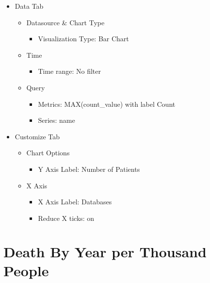 \documentclass[
]{book}
\providecommand{\tightlist}{%
  \setlength{\itemsep}{0pt}\setlength{\parskip}{0pt}}
\begin{document}
\begin{itemize}
\tightlist
\item
  Data Tab

  \begin{itemize}
  \tightlist
  \item
    Datasource \& Chart Type

    \begin{itemize}
    \tightlist
    \item
      Visualization Type: Bar Chart
    \end{itemize}
  \item
    Time

    \begin{itemize}
    \tightlist
    \item
      Time range: No filter
    \end{itemize}
  \item
    Query

    \begin{itemize}
    \tightlist
    \item
      Metrics: MAX(count\_value) with label Count
    \item
      Series: name
    \end{itemize}
  \end{itemize}
\item
  Customize Tab

  \begin{itemize}
  \tightlist
  \item
    Chart Options

    \begin{itemize}
    \tightlist
    \item
      Y Axis Label: Number of Patients
    \end{itemize}
  \item
    X Axis

    \begin{itemize}
    \tightlist
    \item
      X Axis Label: Databases
    \item
      Reduce X ticks: on
    \end{itemize}
  \end{itemize}
\end{itemize}

\hypertarget{death-by-year-per-thousand-people}{%
\section{Death By Year per Thousand People}\label{death-by-year-per-thousand-people}}
\end{document}
